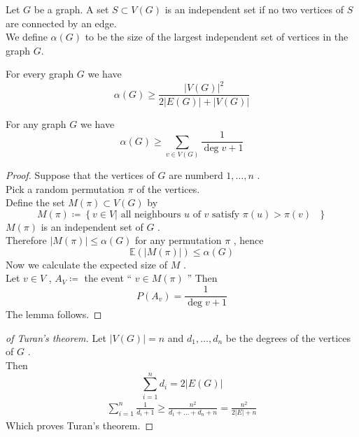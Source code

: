 \documentclass[../main.tex]{subfiles}
\begin{document}
\begin{defn}	
	Let $G$ be a graph. A set $S \subset V( G) $ 	is an independent set if no two vertices of $S$ are connected by an edge.\\
	We define $\alpha( G) $ to be the size of the largest independent set of vertices in the graph $G$.
\end{defn}
\begin{thm}
For every graph $G$ we have
\[ 
	\alpha( G)  \geq \frac{|V( G) |^{2}}{2 |E( G) | + |V( G)| }
\]

\end{thm}
\begin{lemma}
For any graph $G$ we have
\[ 
	\alpha( G)  \geq \sum_{v\in V( G) }^{ }\frac{1}{\deg v + 1}
\]

\end{lemma}
\begin{proof}
Suppose that the vertices of $G$ are numberd $1 , \ldots, n$ .\\
Pick a random permutation $\pi$ of the vertices.\\
Define the set $M( \pi) \subset V( G) $ by
\[ 
	M( \pi) \coloneqq  \left\{ v \in V | \text{ all neighbours $u$ of $v$ satisfy $\pi( u) >\pi ( v) $  }  \right\} 
\]
$M( \pi) $ is an independent set of $G$ .\\
Therefore $|M( \pi) | \leq  \alpha ( G) $ for any permutation $\pi$ , hence
\[ 
	\mathbb{E}( |M( \pi) |) \leq  \alpha( G) 
\]
Now we calculate the expected size of $M$ .\\
Let $v \in V$ , $A_V \coloneqq $ the event `` $v \in M( \pi) $ '' 
Then
\[ 
	P( A_v) = \frac{1}{\deg v + 1}
\]
The lemma follows.




\end{proof}
\begin{proof}[of Turan's theorem]
	Let $|V( G) | = n$ and $d_1, \ldots, d_n$ be the degrees of the vertices of $G$ .\\
	Then
	\[ 
		\sum_{i=1}^{ n}d_i = 2 |E( G) |	
	\]
	\begin{align*}
	\sum_{i=1}^{ n}\frac{1}{d_i+1} \geq \frac{n^{2}}{d_1 + \ldots + d_n + n}= \frac{n^{2}}{2 |E| + n}
	\end{align*}
	Which proves Turan's theorem.
	

\end{proof}

	


 
\end{document}
